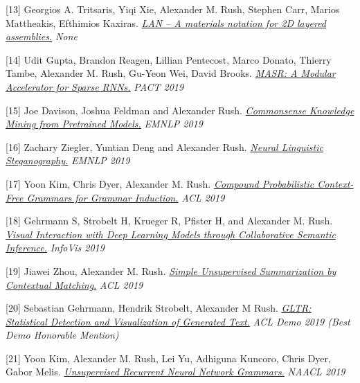 \documentclass[10pt]{article}
\begin{document}
[13] \ind Georgios A. Tritsaris, Yiqi Xie, Alexander M. Rush, Stephen Carr, Marios Mattheakis, Efthimios Kaxiras. \emph{\href{ https://arxiv.org/pdf/1910.03413 }{ LAN -- A materials notation for 2D layered assemblies.} }\emph{ None }

\medskip


[14] \ind Udit Gupta, Brandon Reagen, Lillian Pentecost, Marco Donato, Thierry Tambe, Alexander M. Rush, Gu-Yeon Wei, David Brooks. \emph{\href{ None }{ MASR: A Modular Accelerator for Sparse RNNs.} }\emph{ PACT 2019 }

\medskip


[15] \ind Joe Davison, Joshua Feldman and Alexander Rush. \emph{\href{ None }{ Commonsense Knowledge Mining from Pretrained Models.} }\emph{ EMNLP 2019 }

\medskip


[16] \ind Zachary Ziegler, Yuntian Deng and Alexander Rush. \emph{\href{ https://arxiv.org/abs/1909.01496 }{ Neural Linguistic Steganography.} }\emph{ EMNLP 2019 }

\medskip


[17] \ind Yoon Kim,  Chris Dyer, Alexander M. Rush. \emph{\href{ https://www.aclweb.org/anthology/P19-1228/ }{ Compound Probabilistic Context-Free Grammars for Grammar Induction.} }\emph{ ACL 2019 }

\medskip


[18] \ind Gehrmann S, Strobelt H, Krueger R, Pfister H, and Alexander M. Rush. \emph{\href{ https://arxiv.org/abs/1907.10739 }{ Visual Interaction with Deep Learning Models through Collaborative Semantic Inference.} }\emph{ InfoVis 2019 }

\medskip


[19] \ind Jiawei Zhou, Alexander M. Rush. \emph{\href{ https://www.aclweb.org/anthology/P19-1503 }{ Simple Unsupervised Summarization by Contextual Matching.} }\emph{ ACL 2019 }

\medskip


[20] \ind Sebastian Gehrmann, Hendrik Strobelt, Alexander M Rush. \emph{\href{ https://arxiv.org/abs/1906.04043 }{ GLTR: Statistical Detection and Visualization of Generated Text.} }\emph{ ACL Demo 2019 (Best Demo Honorable Mention) }

\medskip


[21] \ind Yoon Kim, Alexander M. Rush, Lei Yu, Adhiguna Kuncoro, Chris Dyer, Gabor Melis. \emph{\href{ https://arxiv.org/pdf/1904.03746.pdf }{ Unsupervised Recurrent Neural Network Grammars.} }\emph{ NAACL 2019 }
\end{document}
